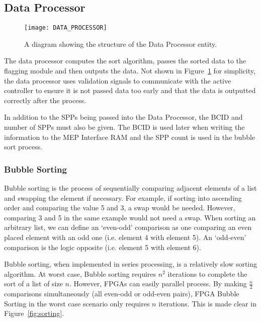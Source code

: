 		\subsection{Data Processor} %
		\label{sub:data_processor}

			\begin{figure}[ht]
				\centering
				\texttt{[image: DATA\_PROCESSOR]}
				\caption{A diagram showing the structure of the Data Processor entity. }
				\label{fig:data_processor_diagram}
			\end{figure}

			The data processor computes the sort algorithm, passes the sorted data to the flagging module and then outputs the data.
			Not shown in Figure~\ref{fig:data_processor_diagram} for simplicity, the data processor uses validation signals to communicate with the active controller to ensure it is not passed data too early and that the data is outputted correctly after the process.

			In addition to the SPPs being passed into the Data Processor, the BCID and number of SPPs must also be given.
			The BCID is used later when writing the information to the MEP Interface RAM and the SPP count is used in the bubble sort process.

		\subsubsection{Bubble Sorting}

			Bubble sorting is the process of sequentially comparing adjacent elements of a list and swapping the element if necessary.
			For example, if sorting into ascending order and comparing the value 5 and 3, a swap would be needed.
			However, comparing 3 and 5 in the same example would not need a swap.
			When sorting an arbitrary list, we can define an `even-odd' comparison as one comparing an even placed element with an odd one (i.e. element 4 with element 5).
			An `odd-even' comparison is the logic opposite (i.e. element 5 with element 6).
			\par
			Bubble sorting, when implemented in series processing, is a relatively slow sorting algorithm.
			At worst case, Bubble sorting requires $n^2$ iterations to complete the sort of a list of size $n$.
			However, FPGAs can easily parallel process.
			By making $\frac{n}{2}$ comparisons simultaneously (all even-odd or odd-even pairs), FPGA Bubble Sorting in the worst case scenario only requires $n$ iterations. This is made clear in Figure~\ref{fig:sorting}.

